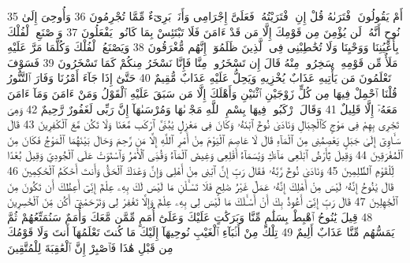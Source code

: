 {\tiny\colorbox{cl_aya}{35}} أَمْ يَقُولُونَ ٱفْتَرَىٰهُ قُلْ إِنِ ٱفْتَرَيْتُهُۥ فَعَلَىَّ إِجْرَامِى وَأَنَا۠ بَرِىٓءٌ مِّمَّا تُجْرِمُونَ
{\tiny\colorbox{cl_aya}{36}} وَأُوحِىَ إِلَىٰ نُوحٍ أَنَّهُۥ لَن يُؤْمِنَ مِن قَوْمِكَ إِلَّا مَن قَدْ ءَامَنَ فَلَا تَبْتَئِسْ بِمَا كَانُوا۟ يَفْعَلُونَ
{\tiny\colorbox{cl_aya}{37}} وَٱصْنَعِ ٱلْفُلْكَ بِأَعْيُنِنَا وَوَحْيِنَا وَلَا تُخَٰطِبْنِى فِى ٱلَّذِينَ ظَلَمُوٓا۟ إِنَّهُم مُّغْرَقُونَ
{\tiny\colorbox{cl_aya}{38}} وَيَصْنَعُ ٱلْفُلْكَ وَكُلَّمَا مَرَّ عَلَيْهِ مَلَأٌ مِّن قَوْمِهِۦ سَخِرُوا۟ مِنْهُ قَالَ إِن تَسْخَرُوا۟ مِنَّا فَإِنَّا نَسْخَرُ مِنكُمْ كَمَا تَسْخَرُونَ
{\tiny\colorbox{cl_aya}{39}} فَسَوْفَ تَعْلَمُونَ مَن يَأْتِيهِ عَذَابٌ يُخْزِيهِ وَيَحِلُّ عَلَيْهِ عَذَابٌ مُّقِيمٌ
{\tiny\colorbox{cl_aya}{40}} حَتَّىٰٓ إِذَا جَآءَ أَمْرُنَا وَفَارَ ٱلتَّنُّورُ قُلْنَا ٱحْمِلْ فِيهَا مِن كُلٍّ زَوْجَيْنِ ٱثْنَيْنِ وَأَهْلَكَ إِلَّا مَن سَبَقَ عَلَيْهِ ٱلْقَوْلُ وَمَنْ ءَامَنَ وَمَآ ءَامَنَ مَعَهُۥٓ إِلَّا قَلِيلٌ
{\tiny\colorbox{cl_aya}{41}} وَقَالَ ٱرْكَبُوا۟ فِيهَا بِسْمِ ٱللَّهِ مَجْر۪ىٰهَا وَمُرْسَىٰهَآ إِنَّ رَبِّى لَغَفُورٌ رَّحِيمٌ
{\tiny\colorbox{cl_aya}{42}} وَهِىَ تَجْرِى بِهِمْ فِى مَوْجٍ كَٱلْجِبَالِ وَنَادَىٰ نُوحٌ ٱبْنَهُۥ وَكَانَ فِى مَعْزِلٍ يَٰبُنَىَّ ٱرْكَب مَّعَنَا وَلَا تَكُن مَّعَ ٱلْكَٰفِرِينَ
{\tiny\colorbox{cl_aya}{43}} قَالَ سَـَٔاوِىٓ إِلَىٰ جَبَلٍ يَعْصِمُنِى مِنَ ٱلْمَآءِ قَالَ لَا عَاصِمَ ٱلْيَوْمَ مِنْ أَمْرِ ٱللَّهِ إِلَّا مَن رَّحِمَ وَحَالَ بَيْنَهُمَا ٱلْمَوْجُ فَكَانَ مِنَ ٱلْمُغْرَقِينَ
{\tiny\colorbox{cl_aya}{44}} وَقِيلَ يَٰٓأَرْضُ ٱبْلَعِى مَآءَكِ وَيَٰسَمَآءُ أَقْلِعِى وَغِيضَ ٱلْمَآءُ وَقُضِىَ ٱلْأَمْرُ وَٱسْتَوَتْ عَلَى ٱلْجُودِىِّ وَقِيلَ بُعْدًا لِّلْقَوْمِ ٱلظَّٰلِمِينَ
{\tiny\colorbox{cl_aya}{45}} وَنَادَىٰ نُوحٌ رَّبَّهُۥ فَقَالَ رَبِّ إِنَّ ٱبْنِى مِنْ أَهْلِى وَإِنَّ وَعْدَكَ ٱلْحَقُّ وَأَنتَ أَحْكَمُ ٱلْحَٰكِمِينَ
{\tiny\colorbox{cl_aya}{46}} قَالَ يَٰنُوحُ إِنَّهُۥ لَيْسَ مِنْ أَهْلِكَ إِنَّهُۥ عَمَلٌ غَيْرُ صَٰلِحٍ فَلَا تَسْـَٔلْنِ مَا لَيْسَ لَكَ بِهِۦ عِلْمٌ إِنِّىٓ أَعِظُكَ أَن تَكُونَ مِنَ ٱلْجَٰهِلِينَ
{\tiny\colorbox{cl_aya}{47}} قَالَ رَبِّ إِنِّىٓ أَعُوذُ بِكَ أَنْ أَسْـَٔلَكَ مَا لَيْسَ لِى بِهِۦ عِلْمٌ وَإِلَّا تَغْفِرْ لِى وَتَرْحَمْنِىٓ أَكُن مِّنَ ٱلْخَٰسِرِينَ
{\tiny\colorbox{cl_aya}{48}} قِيلَ يَٰنُوحُ ٱهْبِطْ بِسَلَٰمٍ مِّنَّا وَبَرَكَٰتٍ عَلَيْكَ وَعَلَىٰٓ أُمَمٍ مِّمَّن مَّعَكَ وَأُمَمٌ سَنُمَتِّعُهُمْ ثُمَّ يَمَسُّهُم مِّنَّا عَذَابٌ أَلِيمٌ
{\tiny\colorbox{cl_aya}{49}} تِلْكَ مِنْ أَنۢبَآءِ ٱلْغَيْبِ نُوحِيهَآ إِلَيْكَ مَا كُنتَ تَعْلَمُهَآ أَنتَ وَلَا قَوْمُكَ مِن قَبْلِ هَٰذَا فَٱصْبِرْ إِنَّ ٱلْعَٰقِبَةَ لِلْمُتَّقِينَ

